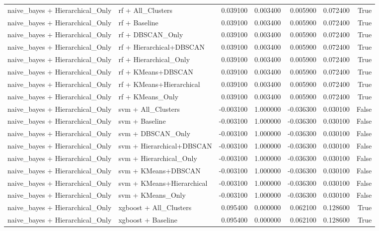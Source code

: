 \begin{tabular}{llrrrrr}
naive_bayes + Hierarchical_Only & rf + All_Clusters & 0.039100 & 0.003400 & 0.005900 & 0.072400 & True \\
naive_bayes + Hierarchical_Only & rf + Baseline & 0.039100 & 0.003400 & 0.005900 & 0.072400 & True \\
naive_bayes + Hierarchical_Only & rf + DBSCAN_Only & 0.039100 & 0.003400 & 0.005900 & 0.072400 & True \\
naive_bayes + Hierarchical_Only & rf + Hierarchical+DBSCAN & 0.039100 & 0.003400 & 0.005900 & 0.072400 & True \\
naive_bayes + Hierarchical_Only & rf + Hierarchical_Only & 0.039100 & 0.003400 & 0.005900 & 0.072400 & True \\
naive_bayes + Hierarchical_Only & rf + KMeans+DBSCAN & 0.039100 & 0.003400 & 0.005900 & 0.072400 & True \\
naive_bayes + Hierarchical_Only & rf + KMeans+Hierarchical & 0.039100 & 0.003400 & 0.005900 & 0.072400 & True \\
naive_bayes + Hierarchical_Only & rf + KMeans_Only & 0.039100 & 0.003400 & 0.005900 & 0.072400 & True \\
naive_bayes + Hierarchical_Only & svm + All_Clusters & -0.003100 & 1.000000 & -0.036300 & 0.030100 & False \\
naive_bayes + Hierarchical_Only & svm + Baseline & -0.003100 & 1.000000 & -0.036300 & 0.030100 & False \\
naive_bayes + Hierarchical_Only & svm + DBSCAN_Only & -0.003100 & 1.000000 & -0.036300 & 0.030100 & False \\
naive_bayes + Hierarchical_Only & svm + Hierarchical+DBSCAN & -0.003100 & 1.000000 & -0.036300 & 0.030100 & False \\
naive_bayes + Hierarchical_Only & svm + Hierarchical_Only & -0.003100 & 1.000000 & -0.036300 & 0.030100 & False \\
naive_bayes + Hierarchical_Only & svm + KMeans+DBSCAN & -0.003100 & 1.000000 & -0.036300 & 0.030100 & False \\
naive_bayes + Hierarchical_Only & svm + KMeans+Hierarchical & -0.003100 & 1.000000 & -0.036300 & 0.030100 & False \\
naive_bayes + Hierarchical_Only & svm + KMeans_Only & -0.003100 & 1.000000 & -0.036300 & 0.030100 & False \\
naive_bayes + Hierarchical_Only & xgboost + All_Clusters & 0.095400 & 0.000000 & 0.062100 & 0.128600 & True \\
naive_bayes + Hierarchical_Only & xgboost + Baseline & 0.095400 & 0.000000 & 0.062100 & 0.128600 & True \\

\end{tabular}
